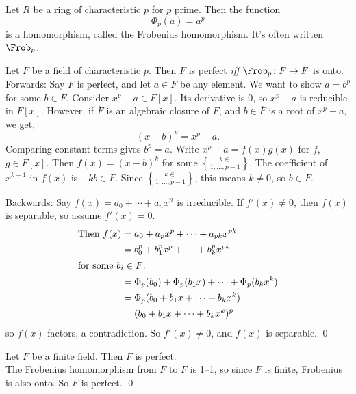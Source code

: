  Let $R$ be a ring of characteristic $p$ for $p$ prime.  Then the function
\[ \Phi_p(a)=a^p \]
is a homomorphism, called the Frobenius homomorphism.  It's often written $\Frob_p$.

\thm Let $F$ be a field of characteristic $p$.  Then $F$ is perfect \emph{iff} $\Frob_p\colon F\to F$ is onto. \\
\pf Forwards: Say $F$ is perfect, and let $a\in F$ be any element.  We want to show $a=b^p$ for some $b\in F$.  Consider $x^p-a\in F[x]$.  Its derivative is $0$, so $x^p-a$ is reducible in $F[x]$.  However, if $\overline F$ is an algebraic closure of $F$, and $b\in\overline F$ is a root of $x^p-a$, we get,
\[ (x-b)^p = x^p - a . \]
Comparing constant terms gives $b^p=a$.  Write $x^p-a=f(x)g(x)$ for $f$, $g\in F[x]$.  Then $f(x)=(x-b)^k$ for some $k\in\brace{1,\dotsc,p-1}$.  The coefficient of $x^{k-1}$ in $f(x)$ is $-kb\in F$.  Since $k\in\brace{1,\dotsc,p-1}$, this means $k\neq0$, so $b\in F$.

Backwards: Say $f(x)=a_0+\dotsb+a_nx^n$ is irreducible.  If $f'(x)\neq0$, then $f(x)$ is separable, so assume $f'(x)=0$.
\begin{align*}
\text{Then } f(x) &= a_0 + a_p x^p + \dotsb + a_{pk} x^{pk} \\
&= b_0^p + b_1^p x^p + \dotsb + b_k^p x^{pk} \\
\intertext{for some $b_i\in F$.}
&= \Phi_p(b_0) + \Phi_p(b_1x) + \dotsb + \Phi_p(b_k x^k) \\
&= \Phi_p(b_0 + b_1 x + \dotsb + b_k x^k) \\
&= (b_0 + b_1 x + \dotsb + b_k x^k)^p
\end{align*}
so $f(x)$ factors, a contradiction.  So $f'(x)\neq0$, and $f(x)$ is separable. \qed

\thm Let $F$ be a finite field.  Then $F$ is perfect. \\
\pf The Frobenius homomorphism from $F$ to $F$ is 1--1, so since $F$ is finite, Frobenius is also onto.  So $F$ is perfect. \qed
